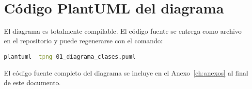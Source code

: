 \section{Código PlantUML del diagrama}

El diagrama es totalmente compilable. El código fuente se entrega como archivo  en el repositorio y puede regenerarse con el comando:

\begin{lstlisting}[language=bash]
plantuml -tpng 01_diagrama_clases.puml
\end{lstlisting}

El código fuente completo del diagrama se incluye en el Anexo~\ref{ch:anexos} al final de este documento.
